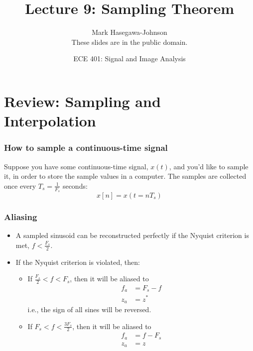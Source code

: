 \documentclass{beamer}
\title{Lecture 9: Sampling Theorem}
\author{Mark Hasegawa-Johnson\\These slides are in the public domain.}
\date{ECE 401: Signal and Image Analysis}
\begin{document}
\begin{frame}
  \maketitle
\end{frame}

\begin{frame}
  \tableofcontents
\end{frame}

\section[Sampling]{Review: Sampling and Interpolation}
\setcounter{subsection}{1}

\begin{frame}
  \frametitle{How to sample a continuous-time signal}

  Suppose you have some continuous-time signal, $x(t)$, and you'd like
  to sample it, in order to store the sample values in a computer.
  The samples are collected once every $T_s=\frac{1}{F_s}$ seconds:
  \begin{displaymath}
    x[n] = x(t=nT_s)
  \end{displaymath}
\end{frame}

\begin{frame}
  \frametitle{Aliasing}

  \begin{itemize}
  \item A sampled sinusoid can be reconstructed perfectly if the
    Nyquist criterion is met, $f < \frac{F_s}{2}$.
  \item If the Nyquist criterion is violated, then:
    \begin{itemize}
    \item If $\frac{F_s}{2}<f<F_s$, then it will be aliased to
      \begin{align*}
        f_a &= F_s-f\\
        z_a &= z^*
      \end{align*}
      i.e., the sign of all sines will be reversed.
    \item If $F_s < f < \frac{3F_s}{2}$, then it will be aliased to
      \begin{align*}
        f_a &= f-F_s\\
        z_a &= z
      \end{align*}
    \end{itemize}
  \end{itemize}
\end{frame}
\end{document}
